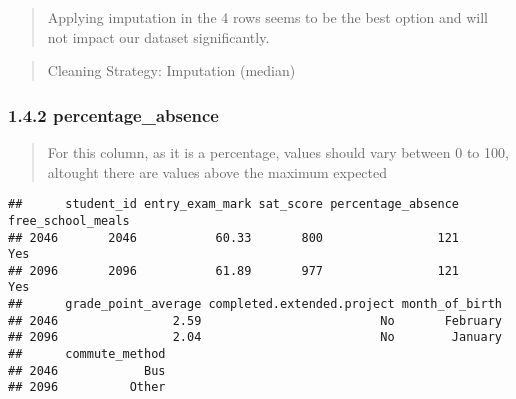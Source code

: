 \documentclass[
]{article}
\newenvironment{Shaded}{\begin{snugshade}}{\end{snugshade}}
\newcommand{\CommentTok}[1]{\textcolor[rgb]{0.56,0.35,0.01}{\textit{#1}}}
\newcommand{\DecValTok}[1]{\textcolor[rgb]{0.00,0.00,0.81}{#1}}
\newcommand{\FunctionTok}[1]{\textcolor[rgb]{0.13,0.29,0.53}{\textbf{#1}}}
\newcommand{\NormalTok}[1]{#1}
\newcommand{\OtherTok}[1]{\textcolor[rgb]{0.56,0.35,0.01}{#1}}
\newcommand{\SpecialCharTok}[1]{\textcolor[rgb]{0.81,0.36,0.00}{\textbf{#1}}}
\begin{document}
\begin{quote}
Applying imputation in the 4 rows seems to be the best option and will
not impact our dataset significantly.
\end{quote}

\begin{quote}
Cleaning Strategy: Imputation (median)
\end{quote}

\begin{Shaded}
\end{Shaded}

\subsubsection{1.4.2 percentage\_absence}\label{percentage_absence}

\begin{quote}
For this column, as it is a percentage, values should vary between 0 to
100, altought there are values above the maximum expected
\end{quote}

\begin{Shaded}
\end{Shaded}

\begin{verbatim}
##      student_id entry_exam_mark sat_score percentage_absence free_school_meals
## 2046       2046           60.33       800                121               Yes
## 2096       2096           61.89       977                121               Yes
##      grade_point_average completed.extended.project month_of_birth
## 2046                2.59                         No       February
## 2096                2.04                         No        January
##      commute_method
## 2046            Bus
## 2096          Other
\end{verbatim}
\end{document}
